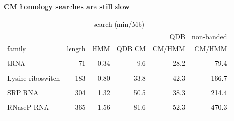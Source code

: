 \documentclass[landscape]{slides}
\begin{document}
\begin{slide}
\begin{center}
\textbf{CM homology searches are still slow}
\end{center}

\small
\begin{center}
\small
\begin{tabular}{lr|rr|r|r}
                  &        & \multicolumn{2}{c|}{search (min/Mb)} & \multicolumn{2}{c}{}\\ \cline{3-4}
                  &        &        &        & \textcolor{mygreen}{QDB}  & non-banded        \\
family            & length & HMM    & \textcolor{mygreen}{QDB CM} & \textcolor{mygreen}{CM/HMM} & CM/HMM  \\ \hline
                  &        &        &        &            &         \\
tRNA              & 71     &  0.34  &  \textcolor{mygreen}{9.6}   & \textcolor{mygreen}{28.2} & \textcolor{black}{79.4}\\
                  &        &        &        &            &         \\
Lysine riboswitch & 183    &  0.80  &  \textcolor{mygreen}{33.8}  & \textcolor{mygreen}{42.3} & \textcolor{black}{166.7}\\
                  &        &        &        &            &         \\
SRP RNA           & 304    &  1.32  &  \textcolor{mygreen}{50.5}  & \textcolor{mygreen}{38.3} & \textcolor{black}{214.4}\\
                  &        &        &        &            &         \\
RNaseP RNA        & 365    &  1.56  &  \textcolor{mygreen}{81.6}  & \textcolor{mygreen}{52.3} & \textcolor{black}{470.3}\\
                  &        &        &        &            &         \\
\end{tabular}
\end{center}

\vfill

\end{slide}
\end{document}
